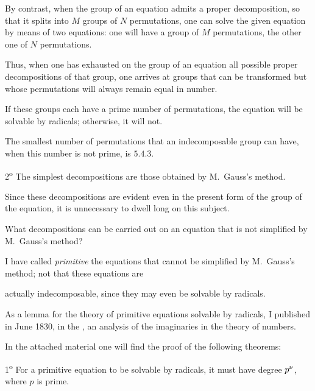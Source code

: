 By contrast, when the group of an equation admits a proper
decomposition, so that it splits into $M$ groups of $N$ permutations,
one can solve the given equation by means of two equations: one will
have a group of $M$ permutations, the other one of $N$ permutations.

Thus, when one has exhausted on the group of an equation all possible
proper decompositions of that group, one arrives at groups that can be
transformed but whose permutations will always remain equal in number.

If these groups each have a prime number of permutations, the equation
will be solvable by radicals; otherwise, it will not.

The smallest number of permutations that an indecomposable group can
have, when this number is not prime, is $5.4.3$.

2\textsuperscript{o} The simplest decompositions are those obtained by
M.~Gauss's method.

Since these decompositions are evident even in the present form of the
group of the equation, it is unnecessary to dwell long on this subject.

What decompositions can be carried out on an equation that is not
simplified by M.~Gauss's method?

I have called \emph{primitive} the equations that cannot be simplified
by M.~Gauss's method; not that these equations are


actually indecomposable, since they may even be solvable by radicals.

As a lemma for the theory of primitive equations solvable by radicals,
I published in June 1830, in the
, an analysis
of the imaginaries in the theory of numbers.

In the attached material
one will find the proof of the following theorems:

1\textsuperscript{o} For a primitive equation to be solvable by
radicals, it must have degree $\GalWitnessVariant{p^{\nu}}{W08-WV002}$,
where $p$ is prime.

